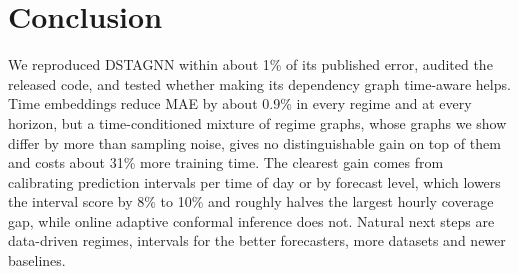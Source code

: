 \documentclass[conference]{IEEEtran}
\begin{document}
\section{Conclusion}
We reproduced DSTAGNN within about 1\% of its published error, audited the released code, and tested whether making its dependency graph time-aware helps. Time embeddings reduce MAE by about 0.9\% in every regime and at every horizon, but a time-conditioned mixture of regime graphs, whose graphs we show differ by more than sampling noise, gives no distinguishable gain on top of them and costs about 31\% more training time. The clearest gain comes from calibrating prediction intervals per time of day or by forecast level, which lowers the interval score by 8\% to 10\% and roughly halves the largest hourly coverage gap, while online adaptive conformal inference does not. Natural next steps are data-driven regimes, intervals for the better forecasters, more datasets and newer baselines.
\end{document}
